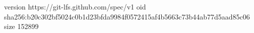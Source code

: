 version https://git-lfs.github.com/spec/v1
oid sha256:b20c302bf5024c0b1d23bfda9984f0572415af4b5663c73b44ab77d5aad85c06
size 152899
